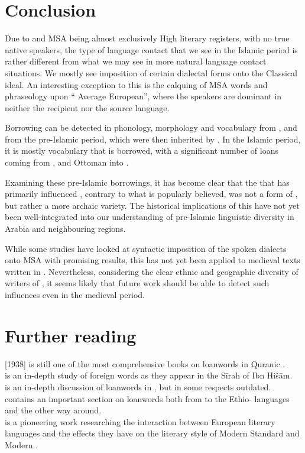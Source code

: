 \documentclass[output=paper]{langsci/langscibook}
\begin{document}
\section{Conclusion}

Due to  and MSA being almost exclusively High literary registers, with no true native speakers, the type of language contact that we see in the Islamic period is rather different from what we may see in more natural language contact situations. We mostly see {imposition} of certain dialectal forms onto the Classical ideal. An interesting exception to this is the {calquing} of MSA words and phraseology upon “ Average European”, where the speakers are dominant in neither the recipient nor the {source language}.

Borrowing can be detected in phonology, morphology and vocabulary from ,  and  from the pre-Islamic period, which were then inherited by . In the Islamic period, it is mostly vocabulary that is borrowed, with a significant number of loans coming from ,  and Ottoman  into .

Examining these pre-Islamic borrowings, it has become clear that the  that has primarily influenced , contrary to what is popularly believed, was not a form of , but rather a more archaic variety. The historical implications of this have not yet been well-integrated into our understanding of pre-Islamic linguistic diversity in Arabia and neighbouring regions.

While some studies have looked at syntactic {imposition} of the spoken dialects onto MSA with promising results, this has not yet been applied to medieval texts written in . Nevertheless, considering the clear ethnic and geographic diversity of writers of , it seems likely that {future} work should be able to detect such influences even in the medieval period.

\section*{Further reading}

\citet{Jeffrey2007} [1938] is still one of the most comprehensive books on {loanwords} in Quranic .\\
\citet{Hebbo1984} is an in-depth study of foreign words as they appear in the Sīrah of Ibn Hišām.\\
\citet{Fraenkel1886} is an in-depth discussion of  {loanwords} in , but in some respects outdated.\\
\citet{Nöldeke1910} contains an important section on {loanwords} both from  to the Ethio- languages and the other way around.\\
\citet{Blau1969} is a pioneering work researching the interaction between European literary languages and the effects they have on the literary style of Modern Standard  and Modern .
\end{document}
